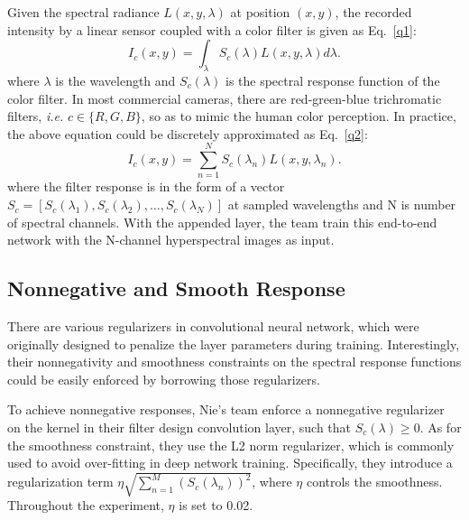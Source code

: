 \documentclass[10pt,twocolumn,letterpaper]{article}
\begin{document}
Given the spectral radiance $L(x, y, \lambda)$ at position $(x, y)$, the recorded intensity by a linear sensor coupled with a color filter is given as Eq.~\ref{q1}:
\begin{equation}
I_c(x,y)=\int_{\lambda} S_c(\lambda)L(x,y,\lambda)d\lambda.   \label{q1}
\end{equation}
where $\lambda$ is the wavelength and $S_c(\lambda)$ is the spectral response function of the color filter. In most commercial cameras, there are red-green-blue trichromatic filters, \emph{i.e.} $c\in \{R, G, B\}$, so as to mimic the human color perception. In practice, the above equation could be discretely approximated as Eq.~\ref{q2}:
\begin{equation}
I_c(x,y)=\sum_{n=1}^{N}S_c(\lambda_n)L(x,y,\lambda_n).   \label{q2}
\end{equation}
where the filter response is in the form of a vector $S_c =
[S_c(λ_1), S_c(λ_2),\ldots, S_c(\lambda_N)]$ at sampled wavelengths and N is number of spectral channels.
With the appended layer, the team train this end-to-end network with the N-channel hyperspectral images as input.


\subsection{Nonnegative and Smooth Response}

There are various regularizers in convolutional neural network, which were originally designed to penalize the layer parameters during training. Interestingly, their nonnegativity and smoothness constraints on the spectral response functions could be easily enforced by borrowing those regularizers.

To achieve nonnegative responses, Nie's team enforce a nonnegative regularizer on the kernel in their filter design convolution layer, such that $S_c(\lambda)\ge 0$. As for the smoothness constraint, they use the L2 norm regularizer, which is commonly used to avoid over-fitting in deep network training. Specifically, they introduce a regularization term $\eta \sqrt{\sum_{n=1}^{M}(S_c(\lambda_n))^2}$, where $\eta$ controls the smoothness. Throughout the experiment, $\eta$ is set to 0.02.
\end{document}
